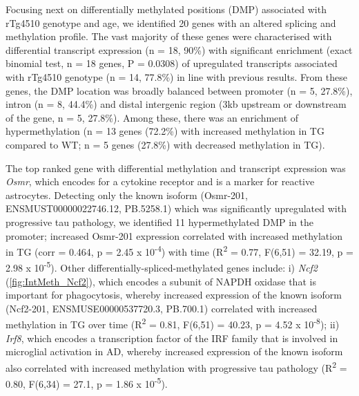 Focusing next on differentially methylated positions (DMP) associated with rTg4510 genotype and age, we identified 20 genes with an altered splicing and methylation profile. The vast majority of these genes were characterised with differential transcript expression (n = 18, 90\%) with significant enrichment (exact binomial test, n = 18 genes, P = 0.0308) of upregulated transcripts associated with rTg4510 genotype (n = 14, 77.8\%) in line with previous results. From these genes, the DMP location was broadly balanced between promoter (n = 5, 27.8\%), intron (n = 8, 44.4\%) and distal intergenic region (3kb upstream or downstream of the gene, n = 5, 27.8\%). Among these, there was an enrichment of hypermethylation (n = 13 genes (72.2\%) with increased methylation in TG compared to WT; n = 5 genes (27.8\%) with decreased methylation in TG).  

The top ranked gene with differential methylation and transcript expression was \textit{Osmr}, which encodes for a cytokine receptor and is a marker for reactive astrocytes. Detecting only the known isoform (Osmr-201, ENSMUST00000022746.12, PB.5258.1) which was significantly upregulated with progressive tau pathology, we identified 11 hypermethylated DMP in the promoter; increased Osmr-201 expression correlated with increased methylation in TG (corr = 0.464, p = 2.45 x 10\textsuperscript{-4}) with time (R\textsuperscript{2} = 0.77, F(6,51) = 32.19, p = 2.98 x 10\textsuperscript{-5}). Other differentially-spliced-methylated genes include: i) \textit{Ncf2} (\cref{fig:IntMeth_Ncf2}), which encodes a subunit of NAPDH oxidase that is important for phagocytosis, whereby increased expression of the known isoform (Ncf2-201, ENSMUSE00000537720.3, PB.700.1) correlated with increased methylation in TG over time (R\textsuperscript{2} = 0.81, F(6,51) = 40.23, p = 4.52 x 10\textsuperscript{-8}); ii) \textit{Irf8}, which encodes a transcription factor of the IRF family that is involved in microglial activation in AD\cite{Zeng2017}, whereby increased expression of the known isoform also correlated with increased methylation with progressive tau pathology (R\textsuperscript{2} = 0.80, F(6,34) = 27.1, p = 1.86 x 10\textsuperscript{-5}). 


